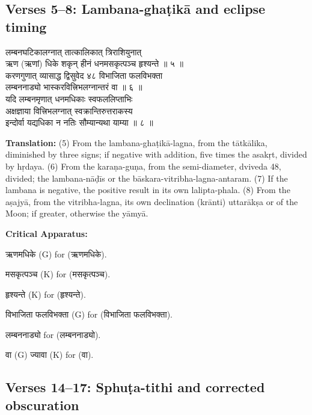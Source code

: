 \documentclass[11pt,a4paper]{article}
\newcommand{\dev}[1]{{\devanagarifont #1}}
\newcommand{\sanskritcol}[1]{%
  \begin{minipage}[t]{0.47\textwidth}
  \vspace{0pt}
  \begin{flushleft}
  #1
  \end{flushleft}
  \end{minipage}%
  \hfill
}
\newcommand{\englishcol}[1]{%
  \begin{minipage}[t]{0.47\textwidth}
  \vspace{0pt}
  \begin{flushleft}
  #1
  \end{flushleft}
  \end{minipage}%
}
\newenvironment{variants}{%
  \small%
  \color{varecolor}%
  \list{}{\leftmargin=2em\itemindent=-1em}%
}{\endlist}
\begin{document}
\subsection*{Verses 5--8: Lambana-ghaṭikā and eclipse timing}

\noindent
\sanskritcol{\dev{लम्बनघटिकालग्नात् तात्कालिकात् त्रिराशियुनात्} \\ \dev{ऋण (ऋणां) धिके शकृन् हीनं धनमसकृत्पञ्च हृश्यन्ते ॥ ५ ॥} \\[0.2cm]
\dev{करणगुणात् व्यासाद्ध द्विसुवेद ४८ विभाजिता फलविभक्ता} \\ \dev{लम्बननाड्यो भास्करवित्त्रिभलग्नान्तरं वा ॥ ६ ॥} \\[0.2cm]
\dev{यदि लम्बनमृणात् धनमधिकाः स्वफललिप्ताभिः} \\ \dev{अक्षज्ञाया वित्त्रिभलग्नात् स्वक्रान्तिरुत्तराकस्य} \\[0.1cm]
\dev{इन्दोर्वा यद्यधिका न नतिः सौम्यान्यथा याम्या ॥ ८ ॥}}
\englishcol{\textbf{Translation:} (5) From the lambana-ghaṭikā-lagna, from the tātkālika,
diminished by three signs; if negative with addition, five times the asakṛt,
divided by hṛdaya. (6) From the karaṇa-guṇa, from the semi-diameter, dviveda 48,
divided; the lambana-nāḍīs or the bāskara-vitribha-lagna-antaram. (7) If the lambana
is negative, the positive result in its own lalipta-phala. (8) From the aṣajyā,
from the vitribha-lagna, its own declination (krānti) uttarākṣa or of the Moon;
if greater, otherwise the yāmyā.}

\vspace{0.4cm}
\textcolor{varecolor}{\textbf{Critical Apparatus:}}
\begin{variants}
\item[5.1] \dev{ऋणमधिके} (G) \dev{for} (\dev{ऋणमधिके}).
\item[5.2] \dev{मसकृत्पञ्च} (K) \dev{for} (\dev{मसकृत्पञ्च}).
\item[5.3] \dev{हृश्यन्ते} (K) \dev{for} (\dev{हृश्यन्ते}).
\item[6.1] \dev{विभाजिता फलविभक्ता} (G) \dev{for} (\dev{विभाजिता फलविभक्ता}).
\item[6.2] \dev{लम्बननाड्यो} \dev{for} (\dev{लम्बननाड्यो}).
\item[8.1] \dev{वा} (G) \dev{ज्यावा} (K) \dev{for} (\dev{वा}).
\end{variants}

\subsection*{Verses 14--17: Sphuṭa-tithi and corrected obscuration}
\end{document}
